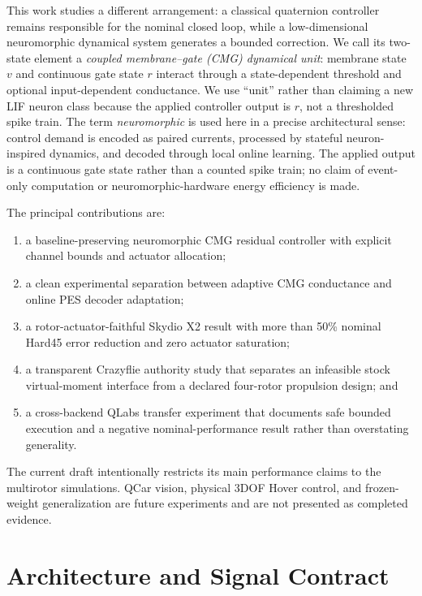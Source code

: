 \documentclass[10pt,twocolumn]{article}
\begin{document}
This work studies a different arrangement: a classical quaternion controller
remains responsible for the nominal closed loop, while a low-dimensional
neuromorphic dynamical system generates a bounded correction. We call its
two-state element a \emph{coupled membrane--gate (CMG) dynamical unit}: membrane
state $v$ and continuous gate state $r$ interact through a state-dependent
threshold and optional input-dependent conductance. We use ``unit'' rather than
claiming a new LIF neuron class because the applied controller output is $r$, not
a thresholded spike train. The
term \emph{neuromorphic} is used here in a precise architectural sense: control
demand is encoded as paired currents, processed by stateful neuron-inspired
dynamics, and decoded through local online learning. The applied output is a
continuous gate state rather than a counted spike train; no claim of event-only
computation or neuromorphic-hardware energy efficiency is made.

The principal contributions are:
\begin{enumerate}
    \item a baseline-preserving neuromorphic CMG residual controller with
    explicit channel bounds and actuator allocation;
    \item a clean experimental separation between adaptive CMG conductance
    and online PES decoder adaptation;
    \item a rotor-actuator-faithful Skydio X2 result with more than 50\% nominal
    Hard45 error reduction and zero actuator saturation;
    \item a transparent Crazyflie authority study that separates an infeasible
    stock virtual-moment interface from a declared four-rotor propulsion design;
    and
    \item a cross-backend QLabs transfer experiment that documents safe bounded
    execution and a negative nominal-performance result rather than overstating
    generality.
\end{enumerate}

The current draft intentionally restricts its main performance claims to the
multirotor simulations. QCar vision, physical 3DOF Hover control, and frozen-
weight generalization are future experiments and are not presented as completed
evidence.

\section{Architecture and Signal Contract}
\end{document}
